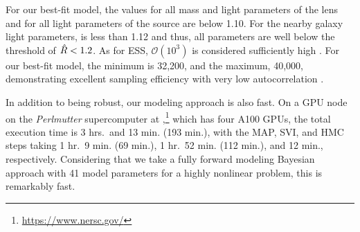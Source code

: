 
For our best-fit model, the \rhat values for all mass and light parameters of the lens and for all light parameters of the source are below 1.10. For the nearby galaxy light parameters, \rhat is less than 1.12 and thus, all parameters are well below the threshold of $\hat{R} < 1.2$.
As for ESS, $\mathcal{O}(10^3)$ is considered sufficiently high \citep[e.g.,][]{carpenter2017a, mandel2022a}. For our best-fit model, the minimum is 32,200, and the maximum, 40,000, demonstrating excellent sampling efficiency with very low autocorrelation \citep[see, e.g.,][]{gu2022a}. 

In addition to being robust, our modeling approach is also fast.
On a GPU node on the {\it Perlmutter} supercomputer at ,\footnote{\url{https://www.nersc.gov/}} 
which has four A100 GPUs,
the total execution time is 3 hrs.\ and 13 min. (193 min.), 
with the MAP, SVI, and HMC steps taking 1 hr.\ 9 min. (69 min.), 1 hr.\ 52 min. (112 min.), and 12 min., respectively.
Considering that we take a fully forward modeling Bayesian approach with 41 model parameters for a highly nonlinear problem, 
this is remarkably fast.

